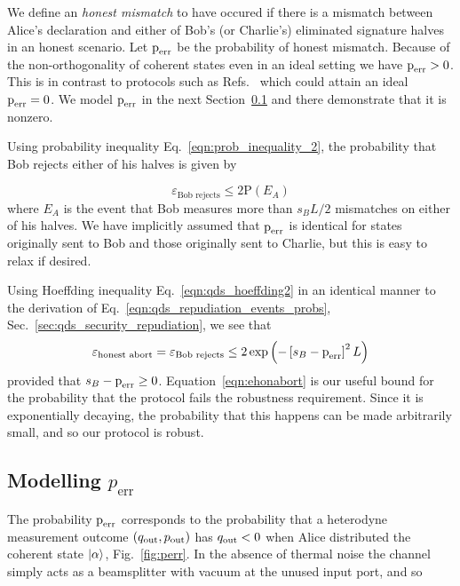 We define an \emph{honest mismatch} to have occured if there is a mismatch between Alice's declaration and either of Bob's (or Charlie's) eliminated signature halves in an honest scenario. Let $\text{p}_{\text{err}}$ be the probability of honest mismatch. Because of the non-orthogonality of coherent states even in an ideal setting we have $\text{p}_{\text{err}} > 0$. This is in contrast to protocols such as Refs.~\cite{Donaldson2016, Collins2014} which could attain an ideal $\text{p}_{\text{err}} = 0$. We model $\text{p}_{\text{err}}$ in the next Section~\ref{sec:qds_modelling_perr} and there demonstrate that it is nonzero.

Using probability inequality Eq.~\ref{eqn:prob_inequality_2}, the probability that Bob rejects either of his halves is given by

\begin{equation}
\varepsilon_{\text{Bob rejects}} \le 2 \text{P}\left(E_A\right)
\end{equation}
where $E_A$ is the event that Bob measures more than $s_B L/2$ mismatches on either of his halves. We have implicitly assumed that $\text{p}_{\text{err}}$ is identical for states originally sent to Bob and those originally sent to Charlie, but this is easy to relax if desired.

Using Hoeffding inequality Eq.~\ref{eqn:qds_hoeffding2} in an identical manner to the derivation of Eq.~\ref{eqn:qds_repudiation_events_probs}, Sec.~\ref{sec:qds_security_repudiation}, we see that
\begin{equation}\label{eqn:ehonabort}
\varepsilon_{\text{honest abort}} = \varepsilon_{\text{Bob rejects}} \le 2 \exp\left( - \left[s_B -\text{p}_{\text{err}}\right]^2 L\right)
\end{equation}
provided that $s_B - \text{p}_{\text{err}} \ge 0$. Equation~\ref{eqn:ehonabort} is our useful bound for the probability that the protocol fails the robustness requirement. Since it is exponentially decaying, the probability that this happens can be made arbitrarily small, and so our protocol is robust.

\subsection{Modelling $p_{\text{err}}$}\label{sec:qds_modelling_perr}

The probability $\text{p}_{\text{err}}$ corresponds to the probability that a heterodyne measurement outcome $\left(q_{\text{out}}, p_{\text{out}}\right)$ has $q_{\text{out}} < 0$ when Alice distributed the coherent state $\ket{\alpha}$, Fig.~\ref{fig:perr}. In the absence of thermal noise the channel simply acts as a beamsplitter with vacuum at the unused input port, and so

